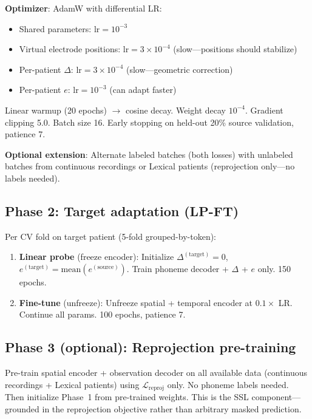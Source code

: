 \documentclass[11pt,letterpaper]{article}
\begin{document}
\textbf{Optimizer}: AdamW with differential LR:
\begin{itemize}[leftmargin=2em]
\item Shared parameters: $\text{lr} = 10^{-3}$
\item Virtual electrode positions: $\text{lr} = 3 \times 10^{-4}$ (slow---positions should stabilize)
\item Per-patient $\Delta$: $\text{lr} = 3 \times 10^{-4}$ (slow---geometric correction)
\item Per-patient $e$: $\text{lr} = 10^{-3}$ (can adapt faster)
\end{itemize}

Linear warmup (20 epochs) $\to$ cosine decay. Weight decay $10^{-4}$. Gradient clipping 5.0. Batch size 16. Early stopping on held-out 20\% source validation, patience 7.

\textbf{Optional extension}: Alternate labeled batches (both losses) with unlabeled batches from continuous recordings or Lexical patients (reprojection only---no labels needed).

\subsection{Phase 2: Target adaptation (LP-FT)}

Per CV fold on target patient (5-fold grouped-by-token):
\begin{enumerate}[leftmargin=2em]
\item \textbf{Linear probe} (freeze encoder): Initialize $\Delta^{(\text{target})} = 0$, $e^{(\text{target})} = \text{mean}(e^{(\text{source})})$. Train phoneme decoder + $\Delta$ + $e$ only. 150 epochs.
\item \textbf{Fine-tune} (unfreeze): Unfreeze spatial + temporal encoder at $0.1\times$ LR. Continue all params. 100 epochs, patience 7.
\end{enumerate}

\subsection{Phase 3 (optional): Reprojection pre-training}

Pre-train spatial encoder + observation decoder on all available data (continuous recordings + Lexical patients) using $\mathcal{L}_{\text{reproj}}$ only. No phoneme labels needed. Then initialize Phase~1 from pre-trained weights. This is the SSL component---grounded in the reprojection objective rather than arbitrary masked prediction.
\end{document}

